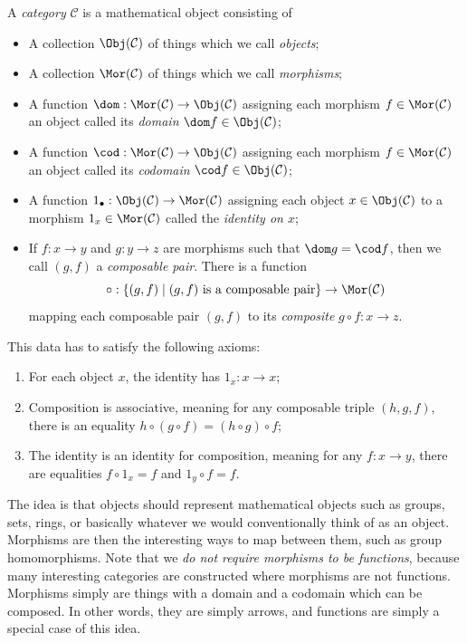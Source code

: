 \documentclass[11pt, A4]{article}
\begin{document}
\begin{definition}\label{2.1}
	A \emph{category} $\mathcal{C} $ is a mathematical object consisting of
	\begin{itemize}
		\item A collection $\Obj(\mathcal{C} ) $ of things which we call \emph{objects};
		\item A collection $\Mor(\mathcal{C} )$ of things which we call \emph{morphisms};
		\item A function $\dom : \Mor(\mathcal{C} ) \to \Obj(\mathcal{C} ) $ assigning each morphism $f\in\Mor(\mathcal{C} )$ an object called its \emph{domain} $\dom f\in \Obj(\mathcal{C} ) $;
		\item A function $\cod : \Mor(\mathcal{C} ) \to \Obj(\mathcal{C} ) $ assigning each morphism $f\in\Mor(\mathcal{C} )$ an object called its \emph{codomain} $\cod f\in \Obj(\mathcal{C} ) $;
		\item A function $1_{\bullet} : \Obj(\mathcal{C} )  \to \Mor(\mathcal{C} )$ assigning each object $x\in \Obj(\mathcal{C} ) $ to a morphism $1_x\in\Mor(\mathcal{C} )$ called the \emph{identity on $x$};
		\item If $f : x \to y$ and $g : y \to z$ are morphisms such that $\dom g=\cod f$, then we call $(g,f)$ a \emph{composable pair}. There is a function
			\[
				\circ : \left\{ (g,f)\mid (g,f)\text{ is a composable pair}  \right\}  \to \Mor(\mathcal{C} )
			\]
			mapping each composable pair $(g,f)$ to its \emph{composite} $g\circ f : x \to z$.
	\end{itemize}
	 This data has to satisfy the following axioms:
	 \begin{enumerate}
		 \item For each object $x$, the identity has $1_x : x \to x$;
		 \item Composition is associative, meaning for any composable triple $(h,g,f)$, there is an equality $h\circ (g\circ f)=(h\circ g)\circ f$;
		 \item The identity is an identity for composition, meaning for any $f : x \to y$, there are equalities $f\circ 1_x=f$ and $1_y\circ f=f$.
	 \end{enumerate}
\end{definition}
\begin{remark}\label{2.2}
	The idea is that objects should represent mathematical objects such as groups, sets, rings, or basically whatever we would conventionally think of as an object. Morphisms are then the interesting ways to map between them, such as group homomorphisms. Note that we \emph{do not require morphisms to be functions}, because many interesting categories are constructed where morphisms are not functions. Morphisms simply are things with a domain and a codomain which can be composed. In other words, they are simply arrows, and functions are simply a special case of this idea.
\end{remark}
\end{document}
